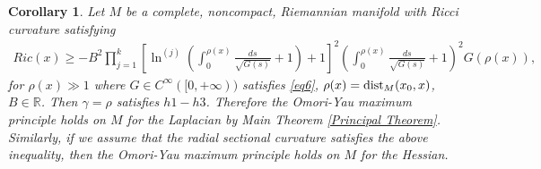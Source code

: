 \documentclass[a4paper]{amsart}
\newtheorem{corollary}{Corollary}
\begin{document}
\begin{corollary}\label{corollarysectionalcondition}
Let $ M $ be a complete, noncompact, Riemannian manifold with Ricci curvature satisfying
\begin{eqnarray*}
Ric(x) \geq - B^{2}\prod_{j=1}^{k}\left[\ln^{(j)}\left(\int_{0}^{\rho(x)}\frac{ds}{\sqrt{G(s)}} + 1\right)+1\right]^{2}\left(\int_{0}^{\rho(x)}\frac{ds}{\sqrt{G(s)}} + 1\right)^{2}G(\rho(x)),
\end{eqnarray*}
for $ \rho (x)\gg 1 $ where $G\in C^{\infty}([0,+\infty)) $ satisfies \eqref{eq6}, $\rho (x)={\rm dist}_{M}(x_{0}, x)$, $B\in \mathbb{R}$. Then $\gamma=\rho$ satisfies $h1-h3$. Therefore the Omori-Yau maximum principle holds on $M$ for the Laplacian by Main Theorem \ref{Principal Theorem}. Similarly, if we assume that the radial sectional curvature satisfies the above inequality, then the Omori-Yau maximum principle holds on $M$ for the Hessian.
\end{corollary}

\vspace{.2mm}
\end{document}

